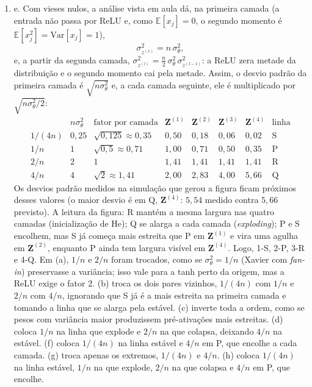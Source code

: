 \documentclass{dlproblemset}
\begin{document}
\begin{enumerate}[1)]
    \item e. Com vieses nulos, a análise vista em aula dá, na primeira camada (a entrada não passa por ReLU e, como $\mathbb{E}[x_j] = 0$, o segundo momento é $\mathbb{E}[x_j^2] = \mathrm{Var}[x_j] = 1$),
    \[
    \sigma^2_{z^{(1)}} = n\,\sigma_\theta^2 ,
    \]
    e, a partir da segunda camada, $\sigma^2_{z^{(l)}} = \tfrac{n}{2}\,\sigma_\theta^2\,\sigma^2_{z^{(l-1)}}$: a ReLU zera metade da distribuição e o segundo momento cai pela metade. Assim, o desvio padrão da primeira camada é $\sqrt{n\sigma_\theta^2}$ e, a cada camada seguinte, ele é multiplicado por $\sqrt{n\sigma_\theta^2/2}$:
    \[
    \begin{array}{c|c|c|cccc|c}
     & n\sigma_\theta^2 & \text{fator por camada} & \mathbf{Z}^{(1)} & \mathbf{Z}^{(2)} & \mathbf{Z}^{(3)} & \mathbf{Z}^{(4)} & \text{linha}\\\hline
    1/(4n) & 0{,}25 & \sqrt{0{,}125} \approx 0{,}35 & 0{,}50 & 0{,}18 & 0{,}06 & 0{,}02 & \text{S}\\
    1/n & 1 & \sqrt{0{,}5} \approx 0{,}71 & 1{,}00 & 0{,}71 & 0{,}50 & 0{,}35 & \text{P}\\
    2/n & 2 & 1 & 1{,}41 & 1{,}41 & 1{,}41 & 1{,}41 & \text{R}\\
    4/n & 4 & \sqrt{2} \approx 1{,}41 & 2{,}00 & 2{,}83 & 4{,}00 & 5{,}66 & \text{Q}
    \end{array}
    \]
    Os desvios padrão medidos na simulação que gerou a figura ficam próximos desses valores (o maior desvio é em Q, $\mathbf{Z}^{(4)}$: $5{,}54$ medido contra $5{,}66$ previsto). A leitura da figura: R mantém a mesma largura nas quatro camadas (inicialização de He); Q se alarga a cada camada (\textit{exploding}); P e S encolhem, mas S já começa mais estreita que P em $\mathbf{Z}^{(1)}$ e vira uma agulha em $\mathbf{Z}^{(2)}$, enquanto P ainda tem largura visível em $\mathbf{Z}^{(4)}$. Logo, 1-S, 2-P, 3-R e 4-Q. Em (a), $1/n$ e $2/n$ foram trocados, como se $\sigma_\theta^2 = 1/n$ (Xavier com \textit{fan-in}) preservasse a variância; isso vale para a tanh perto da origem, mas a ReLU exige o fator $2$. (b) troca os dois pares vizinhos, $1/(4n)$ com $1/n$ e $2/n$ com $4/n$, ignorando que S já é a mais estreita na primeira camada e tomando a linha que se alarga pela estável. (c) inverte toda a ordem, como se pesos com variância maior produzissem pré-ativações mais estreitas. (d) coloca $1/n$ na linha que explode e $2/n$ na que colapsa, deixando $4/n$ na estável. (f) coloca $1/(4n)$ na linha estável e $4/n$ em P, que encolhe a cada camada. (g) troca apenas os extremos, $1/(4n)$ e $4/n$. (h) coloca $1/(4n)$ na linha estável, $1/n$ na que explode, $2/n$ na que colapsa e $4/n$ em P, que encolhe.


\end{enumerate}
\end{document}
